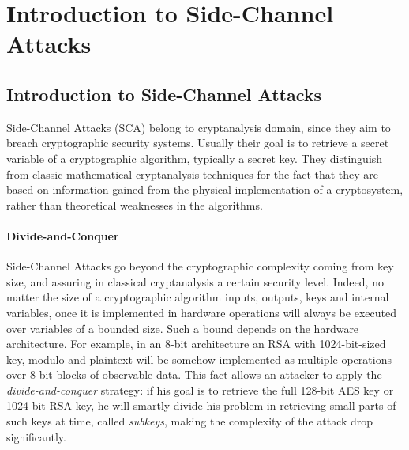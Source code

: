\chapter{Introduction to Side-Channel Attacks} %

\label{ChapterIntroductionSCA}


\section{Introduction to Side-Channel Attacks}

Side-Channel Attacks (SCA) belong to cryptanalysis domain,  since they aim to breach cryptographic security systems. Usually their goal is to retrieve a secret variable of a cryptographic algorithm, typically a secret key. They distinguish from classic mathematical cryptanalysis techniques for the fact that they are based on information gained from the physical implementation of a cryptosystem, rather than theoretical weaknesses in the algorithms.  

\subsubsection{Divide-and-Conquer}
Side-Channel Attacks go beyond the cryptographic complexity coming from key size, and assuring in classical cryptanalysis a certain security level. Indeed, no matter the size of a cryptographic algorithm inputs, outputs, keys and internal variables, once it is implemented in hardware operations will always be executed over variables of a bounded size. Such a bound depends on the hardware architecture. For example, in an 8-bit architecture an RSA with 1024-bit-sized key, modulo and plaintext will be somehow implemented as multiple operations over 8-bit blocks of observable data. This fact allows an attacker to apply the \emph{divide-and-conquer} strategy: if his goal is to retrieve the full 128-bit AES key or 1024-bit RSA key, he will smartly divide his problem in retrieving small parts of such keys at time, called \emph{subkeys}, making the complexity of the attack drop significantly. 

